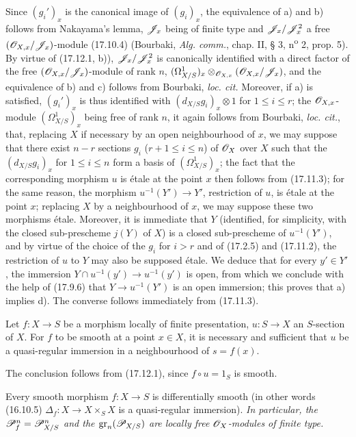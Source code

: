 Since $(g_i')_x$ is the canonical image of $(g_i)_x$, the equivalence of a) and b) follows from Nakayama's lemma, $\mathscr{J}_x$ being of finite type and $\mathscr{J}_x/\mathscr{J}_x^2$ a free $(\mathscr{O}_{X,x}/\mathscr{J}_x)$-module (17.10.4) (Bourbaki, \emph{Alg. comm.}, chap. II, § 3, n\textsuperscript{o} 2, prop. 5). By virtue of (17.12.1, b)), $\mathscr{J}_x/\mathscr{J}_x^2$ is canonically identified with a direct factor of the free $(\mathscr{O}_{X,x}/\mathscr{J}_x)$-module of rank $n$, $(\Omega^1_{X/S})_x\otimes_{\mathscr{O}_{X,x}}(\mathscr{O}_{X,x}/\mathscr{J}_x)$, and the equivalence of b) and c) follows from Bourbaki, \emph{loc. cit.} Moreover, if a) is satisfied, $(g_i')_x$ is thus identified with $(d_{X/S}g_i)_x\otimes1$ for $1\leq i\leq r$; the $\mathscr{O}_{X,x}$-module $(\Omega^1_{X/S})_x$ being free of rank $n$, it again follows from Bourbaki, \emph{loc. cit.}, that, replacing $X$ if necessary by an open neighbourhood of $x$, we may suppose that there exist $n-r$ sections $g_i$ ($r+1\leq i\leq n$) of $\mathscr{O}_X$ over $X$ such that the $(d_{X/S}g_i)_x$ for $1\leq i\leq n$ form a basis of $(\Omega^1_{X/S})_x$; the fact that the corresponding morphism $u$ is étale at the point $x$ then follows from (17.11.3); for the same reason, the morphism $u^{-1}(Y')\to Y'$, restriction of $u$, is étale at the point $x$; replacing $X$ by a neighbourhood of $x$, we may suppose these two morphisms étale. Moreover, it is immediate that $Y$ (identified, for simplicity, with the closed sub-prescheme $j(Y)$ of $X$) is a closed sub-prescheme of $u^{-1}(Y')$, and by virtue of the choice of the $g_i$ for $i>r$ and of (17.2.5) and (17.11.2), the restriction of $u$ to $Y$ may also be supposed étale. We deduce that for every $y'\in Y'$, the immersion $Y\cap u^{-1}(y')\to u^{-1}(y')$ is open, from which we conclude with the help of (17.9.6) that $Y\to u^{-1}(Y')$ is an open immersion; this proves that a) implies d). The converse follows immediately from (17.11.3).

\begin{corollary}[17.12.3]
\label{IV.17.12.3}
Let $f:X\to S$ be a morphism locally of finite presentation, $u:S\to X$ an $S$-section of $X$. For $f$ to be smooth at a point $x\in X$, it is necessary and sufficient that $u$ be a quasi-regular immersion in a neighbourhood of $s=f(x)$.
\end{corollary}

The conclusion follows from (17.12.1), since $f\circ u=1_S$ is smooth.

\begin{proposition}[17.12.4]
\label{IV.17.12.4}
Every smooth morphism $f:X\to S$ is differentially smooth (in other words (16.10.5) $\Delta_f:X\to X\times_SX$ is a quasi-regular immersion). \emph{In particular, the $\mathscr{P}_f^n=\mathscr{P}_{X/S}^n$ and the $\operatorname{gr}_n(\mathscr{P}_{X/S})$ are locally free $\mathscr{O}_X$-modules of finite type.}
\end{proposition}

